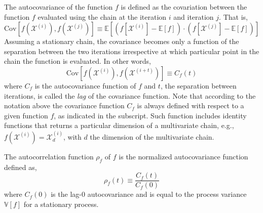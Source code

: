 The autocovariance of the function $f$ is defined as the covariation between the function $f$ evaluated using the chain at the iteration $i$ and iteration $j$.
That is,
\begin{equation}
  \text{Cov}\left[ f(\bm{\mathcal{X}}^{(i)}), f(\bm{\mathcal{X}}^{(j)}) \right] \equiv \mathbb{E}\left[\left(f[\bm{\mathcal{X}}^{(i)}]  - \mathbb{E}[f] \right) \cdot \left(f[\bm{\mathcal{X}}^{(j)}]  - \mathbb{E}[f] \right) \right]
\label{eq:ch5_autocovariance}
\end{equation}
Assuming a stationary chain, the covariance becomes only a function of the separation between the two iterations irrespective at which particular point in the chain the function is evaluated.
In other words,
\begin{equation}
  \text{Cov}\left[ f(\bm{\mathcal{X}}^{(i)}), f(\bm{\mathcal{X}}^{(i+t)}) \right] \equiv C_f(t) 
\label{eq:ch5_autocovariance_function}
\end{equation}
where $C_f$ is the autocovariance function of $f$ and $t$, the separation between iterations, is called the \emph{lag} of the covariance function.
Note that according to the notation above the covariance function $C_f$ is always defined with respect to a given function $f$, as indicated in the subscript.
Such function includes identity functions that returns a particular dimension of a multivariate chain, e.g., $f(\bm{\mathcal{X}}^{(i)}) = \mathcal{X}^{(i)}_d$, with $d$ the dimension of the multivariate chain.

The autocorrelation function $\rho_f$ of $f$ is the normalized autocovariance function defined as,
\begin{equation}
  \rho_f (t) \equiv \frac{C_f(t)}{C_f(0)}
\label{eq:ch5_autocorrelation}
\end{equation}
where $C_f(0)$ is the lag-$0$ autocovariance and is equal to the process variance $\mathbb{V}[f]$ for a stationary process.

